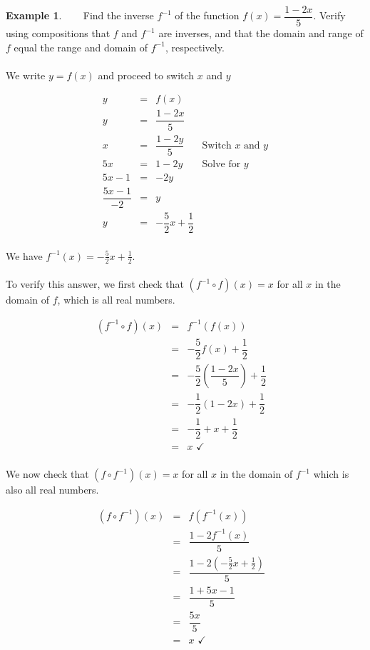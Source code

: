 \documentclass[11pt]{book}
\theoremstyle{definition}  %
\newtheorem{example}{Example}[chapter]
\begin{document}
\begin{example}~~~  Find the inverse $f^{-1}$ of the function $f(x)=\dfrac{1-2x}{5}$.  Verify using compositions that $f$ and $f^{-1}$ are inverses, and that the domain and range of $f$ equal the range and domain of $f^{-1}$, respectively.\\
~\\
We write $y=f(x)$ and proceed to switch $x$ and $y$


\[ \begin{array}{rclr}

y & = & f(x) & \\ [3pt]
y & = &  \dfrac{1-2x}{5} & \\ [6pt]
x & = & \dfrac{1-2y}{5} & \mbox{Switch $x$ and $y$} \\ [6pt]
5x & = & 1 - 2y & \mbox{Solve for $y$} \\ [6pt]
5x-1 & = & -2y & \\ 
\dfrac{5x-1}{-2} & = & y & \\ 
y & = & -\dfrac{5}{2} x + \dfrac{1}{2} & \\
\end{array} \]

We have $f^{-1}(x) = -\frac{5}{2} x + \frac{1}{2}$.\\
~\\
To verify this answer, we first check that $\left(f^{-1} \circ f \right)(x) = x $ for all $x$ in the domain of $f$, which is all real numbers.

\[ \begin{array}{rclr}
\left(f^{-1} \circ f \right)(x) & = & f^{-1}(f(x)) & \\ 
& = & -\dfrac{5}{2} f(x) + \dfrac{1}{2} & \\ [6pt]
& = & -\dfrac{5}{2} \left(\dfrac{1-2x}{5}\right) + \dfrac{1}{2} & \\ 
& = & -\dfrac{1}{2} (1-2x) + \dfrac{1}{2} & \\ [6pt]
& = & -\dfrac{1}{2} + x + \dfrac{1}{2} & \\ 
& = & x \, \, \checkmark \\

\end{array}\]

We now check that $\left(f \circ f^{-1} \right)(x) = x $ for all $x$ in the domain of $f^{-1}$ which is also all real numbers.

\[ \begin{array}{rclr}
\left(f \circ f^{-1} \right)(x) & = & f(f^{-1}(x)) & \\ [3pt]
& = &\dfrac{1-2f^{-1}(x)}{5} & \\ [6pt]
& = &\dfrac{1-2\left(  -\frac{5}{2} x + \frac{1}{2} \right)}{5} & \\ [6pt]
& = & \dfrac{1+5x-1}{5} & \\ 
& = &\dfrac{5x}{5}  & \\
& = & x \, \, \checkmark\\
\end{array}\]


\end{example}
\end{document}
